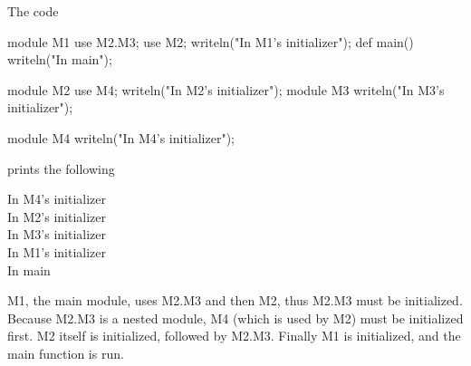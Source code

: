\begin{example}
The code
\begin{chapelpre}
\end{chapelpre}
\begin{chapel}
module M1 {
  use M2.M3;
  use M2;
  writeln("In M1's initializer");
  def main() {
    writeln("In main");
  }
}

module M2 {
  use M4;
  writeln("In M2's initializer");
  module M3 {
    writeln("In M3's initializer");
  }
}

module M4 {
  writeln("In M4's initializer");
}
\end{chapel}
prints the following
\begin{chapelprintoutput}
In M4's initializer\\
In M2's initializer\\
In M3's initializer\\
In M1's initializer\\
In main
\end{chapelprintoutput}
M1, the main module, uses M2.M3 and then M2, thus M2.M3 must be
initialized.  Because M2.M3 is a nested module, M4 (which is used by
M2) must be initialized first.  M2 itself is initialized, followed by
M2.M3.  Finally M1 is initialized, and the main function is run.
\end{example}
